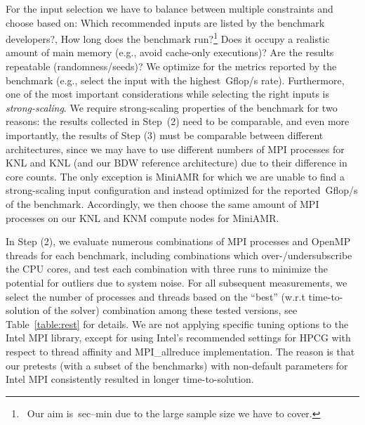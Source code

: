 %
%
For the input selection we have to balance between multiple constraints and choose based on: Which
recommended inputs are listed by the benchmark developers?, How long does the benchmark run?\footnote{~Our
aim is~\unit[1]{sec}--\unit[10]{min} due to the large sample size we have to cover.} Does it occupy a
realistic amount of main memory (e.g., avoid cache-only executions)? Are the results repeatable
(randomness/seeds)? We optimize for the metrics reported by the benchmark (e.g., select the input
with the highest~\unit[]{Gflop/s} rate).
%
%
Furthermore, one of the most important considerations while selecting the right inputs is
\textit{strong-scaling}. We require strong-scaling properties of the benchmark for two reasons:
the results collected in Step~(2) need to be comparable, and even more importantly, the results
of Step (3) must be comparable between different architectures, since we may have to use different
numbers of MPI processes for KNL and KNL (and our BDW reference architecture) due to their difference
in core counts. The only exception is MiniAMR for which we are unable to find a strong-scaling
input configuration and instead optimized for the reported~\unit[]{Gflop/s} of the benchmark. Accordingly, we then choose
the same amount of MPI processes on our KNL and KNM compute nodes for MiniAMR.

In Step (2), we evaluate numerous combinations of MPI processes and OpenMP threads
for each benchmark, including combinations which over-/undersubscribe the CPU cores, and test each
combination with three runs to minimize the potential for outliers due to system noise.
For all subsequent measurements, we select the number of processes and threads based on the ``best'' (w.r.t
time-to-solution of the solver) combination among these tested versions, see Table~\ref{table:rest} for details.
We are not applying specific tuning options to the Intel MPI library, except for using Intel's recommended
settings for HPCG with respect to thread affinity and MPI\_allreduce implementation.
The reason is that our pretests (with a subset of the benchmarks) with non-default parameters for
Intel MPI consistently resulted in longer time-to-solution.

